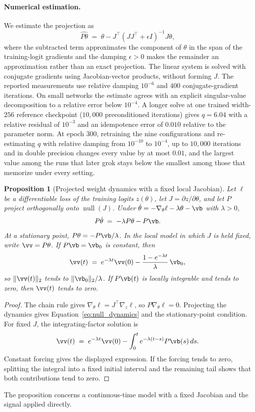 \documentclass{article} %
\newtheorem{proposition}{Proposition}
\begin{document}
\paragraph{Numerical estimation.} We estimate the projection as
\[
\widehat{P\theta} \;=\; \theta - J^\top (J J^\top + \epsilon I)^{-1} J\theta ,
\]
where the subtracted term approximates the component of $\theta$ in the span of the training-logit gradients and the damping $\epsilon > 0$ makes the remainder an approximation rather than an exact projection. The linear system is solved with conjugate gradients using Jacobian-vector products, without forming $J$. The reported measurements use relative damping $10^{-6}$ and $400$ conjugate-gradient iterations. On small networks the estimate agrees with an explicit singular-value decomposition to a relative error below $10^{-4}$. A longer solve at one trained width-$256$ reference checkpoint ($10{,}000$ preconditioned iterations) gives $q = 6.04$ with a relative residual of $10^{-3}$ and an idempotence error of $0.010$ relative to the parameter norm. At epoch $300$, retraining the nine configurations and re-estimating $q$ with relative damping from $10^{-10}$ to $10^{-4}$, up to $10{,}000$ iterations and in double precision changes every value by at most $0.01$, and the largest value among the runs that later grok stays below the smallest among those that memorize under every setting.

\begin{proposition}[Projected weight dynamics with a fixed local Jacobian]
\label{prop:persist}
Let $\ell$ be a differentiable loss of the training logits $z(\theta)$, let $J = \partial z / \partial \theta$, and let $P$ project orthogonally onto $\operatorname{null}(J)$. Under $\dot{\theta} = -\nabla_\theta \ell - \lambda\theta - \vb$ with $\lambda > 0$,
\begin{equation}
P\dot{\theta} \;=\; -\lambda P\theta - P\vb .
\label{eq:null_dynamics}
\end{equation}
At a stationary point, $P\theta = -P\vb/\lambda$. In the local model in which $J$ is held fixed, write $\vv = P\theta$. If $P\vb = \vb_0$ is constant, then
\[
\vv(t) \;=\; e^{-\lambda t}\vv(0) - \frac{1 - e^{-\lambda t}}{\lambda}\,\vb_0 ,
\]
so $\|\vv(t)\|_2$ tends to $\|\vb_0\|_2/\lambda$. If $P\vb(t)$ is locally integrable and tends to zero, then $\vv(t)$ tends to zero.
\end{proposition}
\begin{proof}
The chain rule gives $\nabla_\theta \ell = J^\top \nabla_z \ell$, so $P \nabla_\theta \ell = 0$. Projecting the dynamics gives Equation~\ref{eq:null_dynamics} and the stationary-point condition. For fixed $J$, the integrating-factor solution is
\[
\vv(t) \;=\; e^{-\lambda t}\vv(0) - \int_0^t e^{-\lambda (t-s)} P\vb(s)\, ds .
\]
Constant forcing gives the displayed expression. If the forcing tends to zero, splitting the integral into a fixed initial interval and the remaining tail shows that both contributions tend to zero.
\end{proof}
The proposition concerns a continuous-time model with a fixed Jacobian and the signal applied directly.
\end{document}
